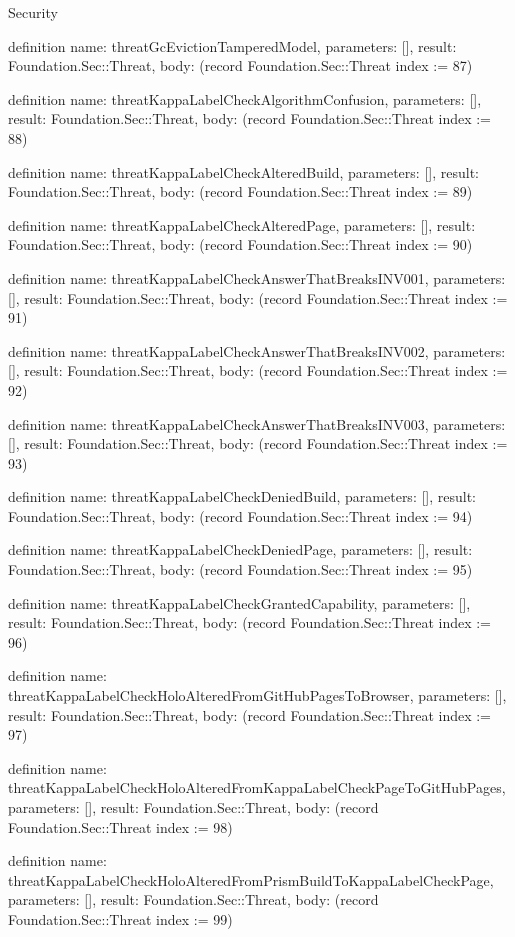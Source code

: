 \begin{lexlean}{Security}
\begin{semanticmodule}
definition{
  name: threatGcEvictionTamperedModel,
  parameters: [],
  result: Foundation.Sec::Threat,
  body: (record Foundation.Sec::Threat {index := 87})
}

definition{
  name: threatKappaLabelCheckAlgorithmConfusion,
  parameters: [],
  result: Foundation.Sec::Threat,
  body: (record Foundation.Sec::Threat {index := 88})
}

definition{
  name: threatKappaLabelCheckAlteredBuild,
  parameters: [],
  result: Foundation.Sec::Threat,
  body: (record Foundation.Sec::Threat {index := 89})
}

definition{
  name: threatKappaLabelCheckAlteredPage,
  parameters: [],
  result: Foundation.Sec::Threat,
  body: (record Foundation.Sec::Threat {index := 90})
}

definition{
  name: threatKappaLabelCheckAnswerThatBreaksINV001,
  parameters: [],
  result: Foundation.Sec::Threat,
  body: (record Foundation.Sec::Threat {index := 91})
}

definition{
  name: threatKappaLabelCheckAnswerThatBreaksINV002,
  parameters: [],
  result: Foundation.Sec::Threat,
  body: (record Foundation.Sec::Threat {index := 92})
}

definition{
  name: threatKappaLabelCheckAnswerThatBreaksINV003,
  parameters: [],
  result: Foundation.Sec::Threat,
  body: (record Foundation.Sec::Threat {index := 93})
}

definition{
  name: threatKappaLabelCheckDeniedBuild,
  parameters: [],
  result: Foundation.Sec::Threat,
  body: (record Foundation.Sec::Threat {index := 94})
}

definition{
  name: threatKappaLabelCheckDeniedPage,
  parameters: [],
  result: Foundation.Sec::Threat,
  body: (record Foundation.Sec::Threat {index := 95})
}

definition{
  name: threatKappaLabelCheckGrantedCapability,
  parameters: [],
  result: Foundation.Sec::Threat,
  body: (record Foundation.Sec::Threat {index := 96})
}

definition{
  name: threatKappaLabelCheckHoloAlteredFromGitHubPagesToBrowser,
  parameters: [],
  result: Foundation.Sec::Threat,
  body: (record Foundation.Sec::Threat {index := 97})
}

definition{
  name: threatKappaLabelCheckHoloAlteredFromKappaLabelCheckPageToGitHubPages,
  parameters: [],
  result: Foundation.Sec::Threat,
  body: (record Foundation.Sec::Threat {index := 98})
}

definition{
  name: threatKappaLabelCheckHoloAlteredFromPrismBuildToKappaLabelCheckPage,
  parameters: [],
  result: Foundation.Sec::Threat,
  body: (record Foundation.Sec::Threat {index := 99})
}


\end{semanticmodule}
\end{lexlean}
